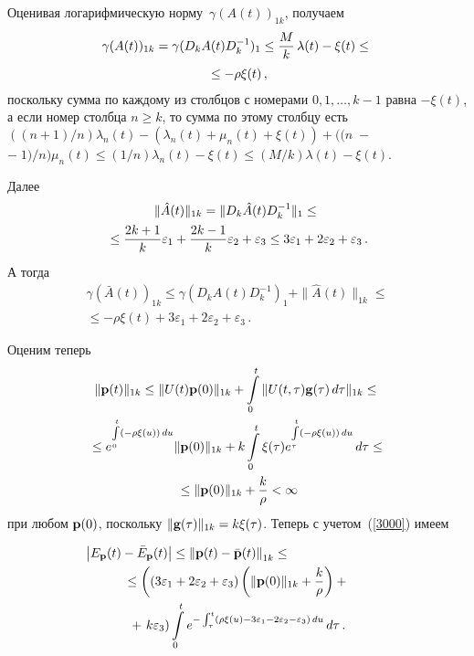 \begin{multicols}{2}
Оценивая логарифмическую норму~$\gamma(A(t))_{1k}$, получаем
\begin{multline*}
\gamma(A(t))_{1k} = \gamma(D_kA(t)D_k^{-1})_{1} \le
 \displaystyle\frac{\displaystyle M\mathstrut}{\displaystyle k\mathstrut}\,\lambda(t) - \xi(t) \le{}\\
 {}\le - \rho \xi(t)\,,
\end{multline*}
поскольку сумма по каждому из столбцов с номерами $0,1, \dots, k-1$ равна 
$- \xi(t)$, а если номер столбца $n \ge k$, то сумма по этому столбцу есть
$ ((n+1)/n) \lambda_n(t)  -\left(\lambda_n(t)+\mu_n(t)+\xi(t)\right) + 
((n\;-$\linebreak $-\;1)/n)\mu_n(t) \le (1/n) \lambda_n(t)  - \xi(t) \le (M/k) \lambda(t)  - \xi(t)$.

Далее
\begin{multline*}
\|\hat{A}(t)\|_{1k}=\|D_k\hat{A}(t)D_k^{-1}\|_{1} \le {}\\
{}\le \displaystyle\frac{\displaystyle 2k+1\mathstrut}{\displaystyle k\mathstrut}\varepsilon_1 +
\displaystyle\frac{\displaystyle 2k-1\mathstrut}{\displaystyle k\mathstrut}\varepsilon_2 +  \varepsilon_3 \le 3\varepsilon_1 +2\varepsilon_2 +  \varepsilon_3\,.
\end{multline*}
А тогда
\begin{multline*}
\gamma(\bar{A}(t))_{1k} \le \gamma(D_kA(t)D_k^{-1})_{1}+\|\hat{A}(t)\|_{1k}  \le{}\\
{}\le - \rho \xi(t) +
3\varepsilon_1 +2\varepsilon_2 +  \varepsilon_3 \,.
\end{multline*}

Оценим теперь
 \begin{multline*}
\|{\bf p}(t)\|_{1k} \le
\|U(t){\bf p}(0) \|_{1k} +
 \int\limits_0^t \| U(t,\tau){\bf g}(\tau)\, d\tau \|_{1k } \le {}\\
{}\le e^{\int\limits_{0}^t \left(-\rho \xi(u)\right)\, du}\|{\bf p}(0) \|_{1k} +  k\int\limits_0^t \xi(\tau)
e^{\int\limits_{\tau}^t \left(-\rho \xi(u)\right) \, du} \, d\tau \le {}\\
{}\le \|{\bf p}(0) \|_{1k} + \displaystyle\frac{\displaystyle k\mathstrut}{\displaystyle \rho\mathstrut} < \infty
\end{multline*}
при любом ${\bf p}(0)$, поскольку $\|{\bf g}(\tau)\|_{1k} = k\xi(\tau)$.
Теперь с учетом~(\ref{3000}) имеем

\noindent
\begin{multline}
\hspace*{-9pt}\left|E_{\bf p}(t)- \bar{E}_{\bf p}(t)\right| \le \left\|\vpi(t)-\bar{\vpi}(t)\right\|_{1k}  \le \phantom{\left|E_{\bf p}(t)- \bar{E}_{\bf p}(t)\right|}{}\\
{}\le \left(\left(3\varepsilon_1 +2\varepsilon_2 +  \varepsilon_3\right)\left(\|{\bf p}(0) \|_{1k} +
 \fr{k}{\rho}\right) +{}\right.\\
{}+\left. k\varepsilon_3\right) \int\limits_0^t e^{-\int_{\tau}^t\left( \rho \xi(u) -
3\varepsilon_1 -2\varepsilon_2 -  \varepsilon_3 \right)\,du}
\, d\tau\,.
\label{3004}
\end{multline}


\end{multicols}

